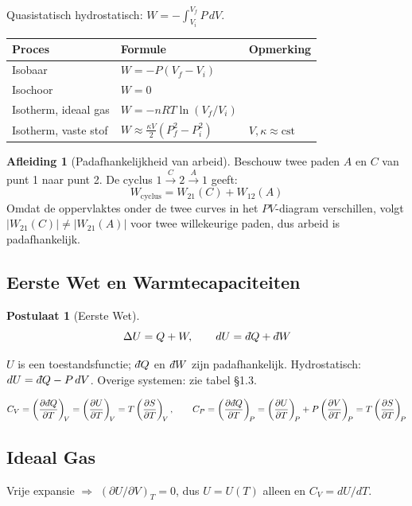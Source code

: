 \documentclass[a4paper,twoside,10pt]{article}
\theoremstyle{definition}
\newtheorem{postulate}{Postulaat}[section]
\newtheorem{derivation}{Afleiding}[section]
\newcommand{\dbar}{{\mkern+3mu\mathchar'26\mkern-12mu d}}
\newcommand{\pd}[3][]{\left(\dfrac{\partial #2}{\partial #3}\right)_{\!#1}}
\begin{document}
Quasistatisch hydrostatisch: $W = -\displaystyle\int_{V_i}^{V_f} P\,dV$.

\begin{center}
\renewcommand{\arraystretch}{1.2}
\begin{tabular}{@{}lll@{}}
\toprule
Proces & Formule & Opmerking \\
\midrule
Isobaar              & $W = -P(V_f-V_i)$                        & \\
Isochoor             & $W = 0$                                   & \\
Isotherm, ideaal gas & $W = -nRT\ln(V_f/V_i)$                   & \\
Isotherm, vaste stof & $W \approx \frac{\kappa V}{2}(P_f^2-P_i^2)$ & $V,\kappa\approx\mathrm{cst}$ \\
\bottomrule
\end{tabular}
\end{center}

\begin{derivation}[Padafhankelijkheid van arbeid]
Beschouw twee paden $A$ en $C$ van punt 1 naar punt 2. De cyclus $1\xrightarrow{C}2\xrightarrow{A}1$ geeft:
\[
  W_{\text{cyclus}} = W_{21}(C) + W_{12}(A)
\]
Omdat de oppervlaktes onder de twee curves in het $PV$-diagram verschillen, volgt
$|W_{21}(C)| \neq |W_{21}(A)|$ voor twee willekeurige paden, dus arbeid is padafhankelijk.
\end{derivation}

\subsection{Eerste Wet en Warmtecapaciteiten}

\begin{postulate}[Eerste Wet]
\[
  \Delta U = Q + W, \qquad dU = \dbar Q + \dbar W
\]
\end{postulate}

$U$ is een toestandsfunctie; $\dbar Q$ en $\dbar W$ zijn padafhankelijk.
Hydrostatisch: $dU = \dbar Q - P\,dV$. Overige systemen: zie tabel §1.3.

\[
  C_V = \pd[V]{\dbar Q}{T} = \pd[V]{U}{T} = T\pd[V]{S}{T},
  \qquad
  C_P = \pd[P]{\dbar Q}{T} = \pd[P]{U}{T} + P\pd[P]{V}{T} = T\pd[P]{S}{T}
\]

\subsection{Ideaal Gas}

Vrije expansie $\Rightarrow$ $(\partial U/\partial V)_T = 0$, dus $U = U(T)$ alleen en $C_V = dU/dT$.
\end{document}
